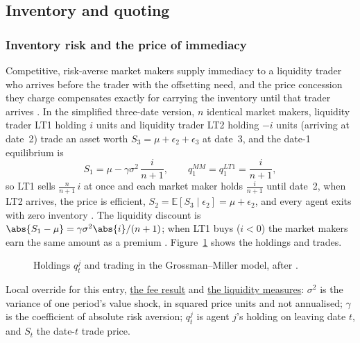 \subsection{Inventory and quoting}

\subsubsection{Inventory risk and the price of immediacy}

\begin{qfmodel}\label{mod:grossman-miller}
 Competitive, risk-averse market makers supply immediacy to a liquidity trader who arrives before the trader with the offsetting need, and the price concession they charge compensates exactly for carrying the inventory until that trader arrives \citep[chap.~``A Primer on the Microstructure of Financial Markets'', p.~21]{crypto-cartea}. In the simplified three-date version, $n$ identical market makers, liquidity trader LT1 holding $i$ units and liquidity trader LT2 holding $-i$ units (arriving at date~2) trade an asset worth $S_3=\mu+\epsilon_2+\epsilon_3$ at date~3, and the date-1 equilibrium is \citep[same chap., pp.~23--24]{crypto-cartea}
\[ S_1=\mu-\gamma\sigma^2\,\frac{i}{n+1}, \qquad q_1^{MM}=q_1^{LT1}=\frac{i}{n+1}, \]
so LT1 sells $\frac{n}{n+1}\,i$ at once and each market maker holds $\frac{i}{n+1}$ until date~2, when LT2 arrives, the price is efficient, $S_2=\mathbb{E}[S_3\mid\epsilon_2]=\mu+\epsilon_2$, and every agent exits with zero inventory \citep[same chap., pp.~22--24]{crypto-cartea}. The liquidity discount is $\abs{S_1-\mu}=\gamma\sigma^2\abs{i}/(n+1)$; when LT1 buys ($i<0$) the market makers earn the same amount as a premium \citep[same chap., p.~24]{crypto-cartea}. Figure~\ref{fig:grossman_miller_trading} shows the holdings and trades.
\begin{figure}[H]
\centering
\scalebox{0.82}{}
\caption{Holdings $q_t^j$ and trading in the Grossman--Miller model, after \citep[Figure~2.1, p.~23]{crypto-cartea}.}\label{fig:grossman_miller_trading}
\end{figure}

 Local override for this entry, \hyperref[res:grossman-miller-trading-fees]{the fee result} and \hyperref[res:grossman-miller-liquidity-measures]{the liquidity measures}: $\sigma^2$ is the variance of one period's value shock, in squared price units and not annualised; $\gamma$ is the coefficient of absolute risk aversion; $q_t^j$ is agent $j$'s holding on leaving date $t$, and $S_t$ the date-$t$ trade price.


\end{qfmodel}
